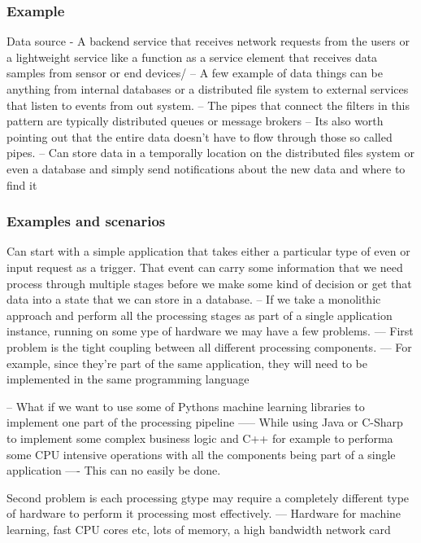 \subsubsection{Example}
Data source - A backend service that receives network requests from the users or a lightweight service like a function as a service element that receives data samples from sensor or end devices/
-- A few example of data things can be anything from internal databases or a distributed file system to external services that listen to events from out system.
-- The pipes that connect the filters in this pattern are typically distributed queues or message brokers
-- Its also worth pointing out that the entire data doesn't have to flow through those so called pipes.
-- Can store data in a temporally location on the distributed files system or even a database and simply send notifications about the new data and where to find it

\subsubsection{Examples and scenarios}
Can start with a simple application that takes either a particular type of even or input request as a trigger.
That event can carry some information that we need process through multiple stages before we make some kind of decision or get that data into a state that we can store in a database.
-- If we take a monolithic approach and perform all the processing stages as part of a single application instance, running on some ype of hardware we may have a few problems.
--- First problem is the tight coupling between all different processing components.
--- For example, since they're part of the same application, they will need to be implemented in the same programming language

-- What if we want to use some of Pythons machine learning libraries to implement one part of the processing pipeline
----- While using Java or C-Sharp to implement some complex business logic and C++ for example to performa some CPU intensive operations with all the components being part of a single application
---- This can no easily be done.

Second problem is each processing gtype may require a completely different type of hardware to perform it processing most effectively.
--- Hardware for machine learning, fast CPU cores etc, lots of memory, a high bandwidth network card

